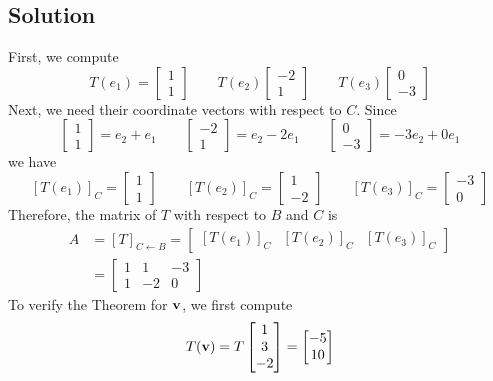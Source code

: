 \subsection*{Solution}
First, we compute
\[T(e_1)=\begin{bmatrix}
        1 \\1
    \end{bmatrix} \qquad T(e_2)\begin{bmatrix}
        -2 \\1
    \end{bmatrix} \qquad T(e_3)\begin{bmatrix}
        0 \\-3
    \end{bmatrix}\]
Next, we need their coordinate vectors with respect to $C$. Since
\[\begin{bmatrix}
        1 \\1
    \end{bmatrix}=e_2+e_1 \qquad \begin{bmatrix}
        -2 \\ 1
    \end{bmatrix}=e_2-2e_1 \qquad \begin{bmatrix}
        0 \\ -3
    \end{bmatrix}=-3e_2+0e_1\]
we have
\[[T(e_1)]_C=\begin{bmatrix}
        1 \\1
    \end{bmatrix} \qquad [T(e_2)]_C=\begin{bmatrix}
        1 \\-2
    \end{bmatrix} \qquad [T(e_3)]_C=\begin{bmatrix}
        -3 \\0
    \end{bmatrix}\]
Therefore, the matrix of $T$ with respect to $B$ and $C$ is
\begin{align*}
    A & =[T]_{C\leftarrow B}=\begin{bmatrix}
        [T(e_1)]_C & [T(e_2)]_C & [T(e_3)]_C
    \end{bmatrix} \\
      & =\begin{bmatrix}
        1 & 1  & -3 \\
        1 & -2 & 0
    \end{bmatrix}
\end{align*}
To verify the Theorem for $\mathbf{v}$, we first compute
\[T(\mathbf{v})=T\begin{bmatrix}
        1 \\3\\-2
    \end{bmatrix}=\begin{bmatrix}
        -5 \\10
    \end{bmatrix}\]
